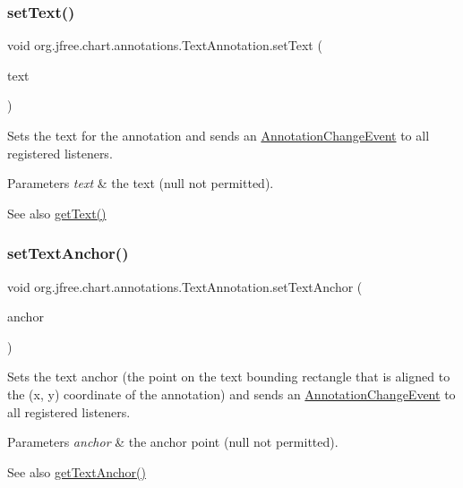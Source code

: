 \subsubsection{\texorpdfstring{set\+Text()}{setText()}}
{\footnotesize\ttfamily void org.\+jfree.\+chart.\+annotations.\+Text\+Annotation.\+set\+Text (\begin{DoxyParamCaption}\item[{String}]{text }\end{DoxyParamCaption})}

Sets the text for the annotation and sends an \mbox{\hyperlink{}{Annotation\+Change\+Event}} to all registered listeners.


\begin{DoxyParams}{Parameters}
{\em text} & the text ({\ttfamily null} not permitted).\\
\hline
\end{DoxyParams}
\begin{DoxySeeAlso}{See also}
\mbox{\hyperlink{classorg_1_1jfree_1_1chart_1_1annotations_1_1_text_annotation_a74805ae428257122d1ebb45fd7f938cc}{get\+Text()}} 
\end{DoxySeeAlso}
\mbox{\label{classorg_1_1jfree_1_1chart_1_1annotations_1_1_text_annotation_a8a4d5edc3f5f6b8fecaa450f4b56c087}} 
\subsubsection{\texorpdfstring{set\+Text\+Anchor()}{setTextAnchor()}}
{\footnotesize\ttfamily void org.\+jfree.\+chart.\+annotations.\+Text\+Annotation.\+set\+Text\+Anchor (\begin{DoxyParamCaption}\item[{Text\+Anchor}]{anchor }\end{DoxyParamCaption})}

Sets the text anchor (the point on the text bounding rectangle that is aligned to the (x, y) coordinate of the annotation) and sends an \mbox{\hyperlink{}{Annotation\+Change\+Event}} to all registered listeners.


\begin{DoxyParams}{Parameters}
{\em anchor} & the anchor point ({\ttfamily null} not permitted).\\
\hline
\end{DoxyParams}
\begin{DoxySeeAlso}{See also}
\mbox{\hyperlink{classorg_1_1jfree_1_1chart_1_1annotations_1_1_text_annotation_a12fccb5d729ac02e696948e7bf0c1c3e}{get\+Text\+Anchor()}} 
\end{DoxySeeAlso}


